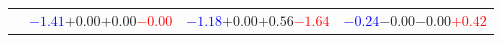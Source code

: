 \documentclass[compress]{beamer}
\begin{document}
\begin{frame}
\begin{tabular}{r | c | c | c}
          & \textcolor{blue}{$-1.41$}\hspace{0.1 cm}$+0.00$\hspace{0.1 cm}$+0.00$\hspace{0.1 cm}\textcolor{red}{$-0.00$} & \textcolor{blue}{$-1.18$}\hspace{0.1 cm}$+0.00$\hspace{0.1 cm}$+0.56$\hspace{0.1 cm}\textcolor{red}{$-1.64$} & \textcolor{blue}{$-0.24$}\hspace{0.1 cm}$-0.00$\hspace{0.1 cm}$-0.00$\hspace{0.1 cm}\textcolor{red}{$+0.42$} \\
\end{tabular}
\end{frame}
\end{document}
